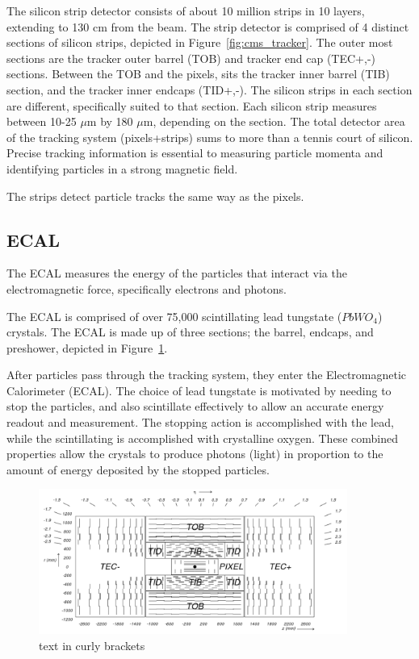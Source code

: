 The silicon strip detector consists of about 10 million strips in 10 layers, extending to 130 cm from the beam. 
The strip detector is comprised of 4 distinct sections of silicon strips, depicted in
Figure~\ref{fig:cms_tracker}. The outer most sections are the tracker outer barrel (TOB) and tracker end cap (TEC+,-) sections. Between the TOB and the pixels, sits the tracker
inner barrel (TIB) section, and the tracker inner endcaps (TID+,-). The silicon strips in each section are different, specifically suited to that section.
Each silicon strip measures between 10-25 $\mu$m by 180 $\mu$m, depending on the section. The total detector area of the tracking system (pixels+strips) sums to more than
a tennis court of silicon. Precise tracking information is essential to measuring particle momenta and identifying particles in a strong magnetic field.

The strips detect particle tracks the same way as the pixels.

\subsection{ECAL}




The ECAL measures the energy of the particles that interact via the electromagnetic force, specifically electrons and photons.

The ECAL is comprised of over 75,000 scintillating lead tungstate ($PbWO_{4}$) crystals. The ECAL is made up of
three sections; the barrel, endcaps, and preshower, depicted in Figure~\ref{fig:cms_ecal}. 

After particles pass through the tracking system, they enter the Electromagnetic Calorimeter (ECAL). The choice of lead tungstate is motivated by needing to stop the particles, and
also scintillate effectively to allow an accurate energy readout and measurement. The stopping action is accomplished with the lead, while the scintillating is accomplished with
crystalline oxygen. These combined properties allow the crystals to produce photons (light) in proportion to the amount of energy deposited by the stopped particles.



\begin{figure}[hbtp]
 \begin{center}
   \includegraphics[width=0.9\textwidth]{tracker_yz.pdf}
   \caption[text in square brackets]{text in curly brackets}
   \label{fig:cms_ecal}
 \end{center}
\end{figure}


